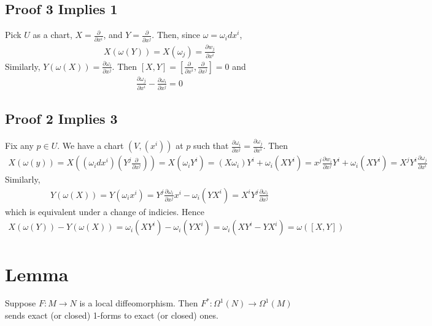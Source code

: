\documentclass[11pt]{article}
\begin{document}
\subsection*{Proof 3 Implies 1}
\label{sec:org5852808}
Pick \(U\) as a chart, \(X=\frac{\partial}{\partial x^{i}}\), and \(Y=\frac{\partial}{\partial x^{j}}\). Then, since \(\omega=\omega_{i}dx^{i}\),\\
\begin{align*}
  X(\omega(Y))
  =X(\omega_{j})
  =\frac{\partial w_{j}}{\partial x^{i}}
\end{align*}
Similarly, \(Y(\omega(X))=\frac{\partial\omega_{i}}{\partial x^{j}}\). Then \([X,Y]=\left[ \frac{\partial}{\partial x^{i}},\frac{\partial}{\partial x^{j}} \right]=0\) and\\
\begin{align*}
  \frac{\partial \omega_{j}}{\partial x^{i}}-\frac{\partial \omega_{i}}{\partial x^{j}}=0
\end{align*}
\subsection*{Proof 2 Implies 3}
\label{sec:org075edf7}
Fix any \(p\in U\). We have a chart \((V,(x^{i}))\) at \(p\) such that \(\frac{\partial\omega_{i}}{\partial x^{j}}=\frac{\partial \omega_{j}}{\partial x^{i}}\). Then\\
\begin{align*}
  X(\omega(y))
  =X\left( (\omega_{i}dx^{i})\left( Y^{j}\frac{\partial}{\partial x^{j}} \right) \right)
  =X(\omega_{i}Y^{i})
  =(X\omega_{i})Y^{i}+\omega_{i}(XY^{i})
  =x^{j}\frac{\partial w_{i}}{\partial x^{j}}Y^{i}+\omega_{i}(XY^{i})
  =X^{j}Y^{i}\frac{\partial\omega_{j}}{\partial x^{i}}
\end{align*}
Similarly,\\
\begin{align*}
  Y(\omega(X))
  =Y(\omega_{i}x^{i})
  =Y^{j}\frac{\partial \omega_{i}}{\partial x^{j}}x^{i}-\omega_{i}(YX^{i})
  =X^{i}Y^{j}\frac{\partial\omega_{i}}{\partial x^{j}}
\end{align*}
which is equivalent under a change of indicies. Hence\\
\begin{align*}
  X(\omega(Y))-Y(\omega(X))
  =\omega_{i}(XY^{i})-\omega_{i}(YX^{i})
  =\omega_{i}(XY^{i}-YX^{i})
  =\omega([X,Y])
\end{align*}
\section*{Lemma}
\label{sec:org6ea6438}
Suppose \(F:M\to N\) is a local diffeomorphism. Then \(F^{*}:\Omega^{1}(N)\to\Omega^{1}(M)\) sends exact (or closed) 1-forms to exact (or closed) ones.\\
\end{document}
